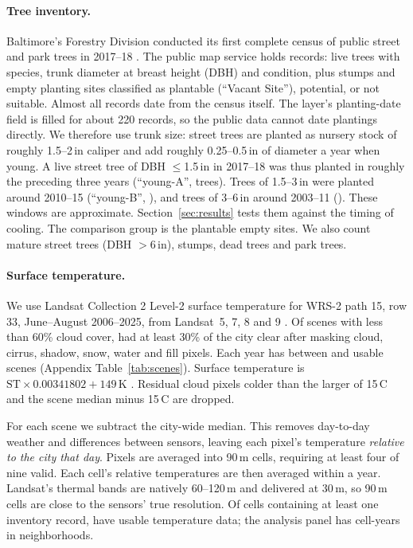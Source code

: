 \documentclass[11pt]{article}
\newcommand{\degC}{\,\textdegree C}
\begin{document}
\paragraph{Tree inventory.} Baltimore's Forestry Division conducted its first complete census of public street and park trees in 2017--18 \citep{baltimoretrees}. The public map service holds \NInventory{} records: live trees with species, trunk diameter at breast height (DBH) and condition, plus stumps and empty planting sites classified as plantable (``Vacant Site''), potential, or not suitable. Almost all records date from the census itself. The layer's planting-date field is filled for about 220 records, so the public data cannot date plantings directly. We therefore use trunk size: street trees are planted as nursery stock of roughly 1.5--2\,in caliper and add roughly 0.25--0.5\,in of diameter a year when young. A live street tree of DBH $\le$1.5\,in in 2017--18 was thus planted in roughly the preceding three years (``young-A'', \NYoungA{} trees). Trees of 1.5--3\,in were planted around 2010--15 (``young-B'', \NYoungB{}), and trees of 3--6\,in around 2003--11 (\NMid{}). These windows are approximate. Section~\ref{sec:results} tests them against the timing of cooling. The comparison group is the \NVacant{} plantable empty sites. We also count \NMature{} mature street trees (DBH $>$6\,in), stumps, dead trees and park trees.

\paragraph{Surface temperature.} We use Landsat Collection 2 Level-2 surface temperature for WRS-2 path 15, row 33, June--August 2006--2025, from Landsat~5, 7, 8 and 9 \citep{planetary}. Of \NScenes{} scenes with less than 60\% cloud cover, \NScenesUsed{} had at least 30\% of the city clear after masking cloud, cirrus, shadow, snow, water and fill pixels. Each year has between \ScenesPerYearMin{} and \ScenesPerYearMax{} usable scenes (Appendix Table~\ref{tab:scenes}). Surface temperature is $\mathrm{ST}\times0.00341802+149$\,K \citep{usgs2024}. Residual cloud pixels colder than the larger of 15\degC{} and the scene median minus 15\degC{} are dropped.

For each scene we subtract the city-wide median. This removes day-to-day weather and differences between sensors, leaving each pixel's temperature \emph{relative to the city that day}. Pixels are averaged into 90\,m cells, requiring at least four of nine valid. Each cell's relative temperatures are then averaged within a year. Landsat's thermal bands are natively 60--120\,m and delivered at 30\,m, so 90\,m cells are close to the sensors' true resolution. Of \NGridCells{} cells containing at least one inventory record, \NCells{} have usable temperature data; the analysis panel has \NCellYears{} cell-years in \NNbhd{} neighborhoods.
\end{document}
